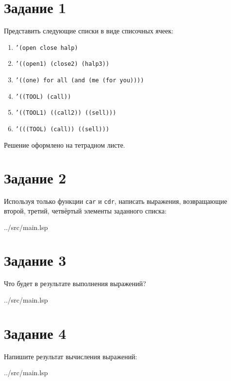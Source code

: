 \section*{Задание 1}

Представить следующие списки в виде списочных ячеек:
\begin{enumerate}[topsep=0pt]
	\item {\texttt{'(open close halp)}}
	\item {\texttt{'((open1) (close2) (halp3))}}
	\item {\texttt{'((one) for all (and (me (for you))))}}
	\item {\texttt{'((TOOL) (call))}}
	\item {\texttt{'((TOOL1) ((call2)) ((sell)))}}
	\item {\texttt{'(((TOOL) (call)) ((sell)))}}
\end{enumerate}

Решение оформлено на тетрадном листе.

\section*{Задание 2}


Используя только функции {\texttt{car}} и {\texttt{cdr}}, написать выражения, возвращающие второй, третий, четвёртый элементы заданного списка:


\begin{lstinputlisting}[
	caption={Задание 1},
	label={lst:t1},
	style={lsp},
	linerange={3-7},
	]{../src/main.lsp}
\end{lstinputlisting}

\section*{Задание 3}


Что будет в результате выполнения выражений?


\begin{lstinputlisting}[
	caption={Задание 2},
	label={lst:t2},
	style={lsp},
	linerange={11-14},
	]{../src/main.lsp}
\end{lstinputlisting}

\section*{Задание 4}


Напишите результат вычисления выражений:


\begin{lstinputlisting}[
	caption={Задание 3},
	label={lst:t3},
	style={lsp},
	linerange={16-31},
	]{../src/main.lsp}
\end{lstinputlisting}

